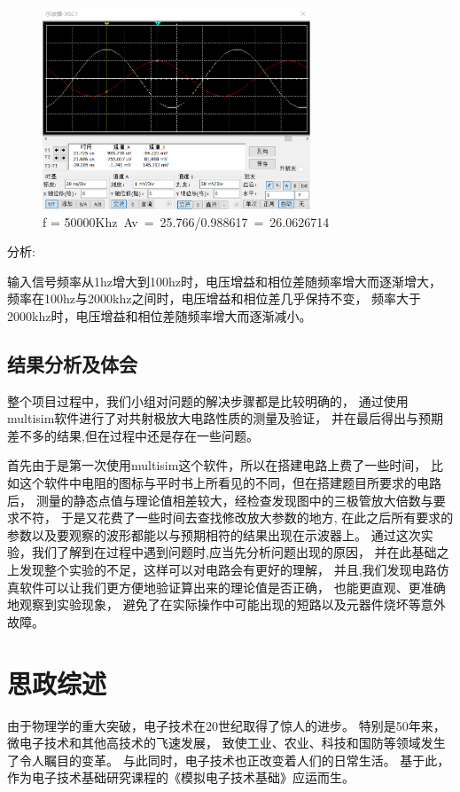 \documentclass[10pt, conference, compsocconf, a4paper]{IEEEtran}
\begin{document}
\begin{figure}[H]
  \includegraphics[width=8cm]{img/j.png}
  \caption{f = 50000Khz Av = 25.766/0.988617 = 26.0626714}
\end{figure}



分析:\par
输入信号频率从1hz增大到100hz时，电压增益和相位差随频率增大而逐渐增大，
频率在100hz与2000khz之间时，电压增益和相位差几乎保持不变，
频率大于2000khz时，电压增益和相位差随频率增大而逐渐减小。

\subsection{结果分析及体会}
整个项目过程中，我们小组对问题的解决步骤都是比较明确的，
通过使用multisim软件进行了对共射极放大电路性质的测量及验证，
并在最后得出与预期差不多的结果,但在过程中还是存在一些问题。\par
首先由于是第一次使用multisim这个软件，所以在搭建电路上费了一些时间，
比如这个软件中电阻的图标与平时书上所看见的不同，但在搭建题目所要求的电路后，
测量的静态点值与理论值相差较大，经检查发现图中的三极管放大倍数与要求不符，
于是又花费了一些时间去查找修改放大参数的地方,
在此之后所有要求的参数以及要观察的波形都能以与预期相符的结果出现在示波器上。
通过这次实验，我们了解到在过程中遇到问题时,应当先分析问题出现的原因，
并在此基础之上发现整个实验的不足，这样可以对电路会有更好的理解，
并且,我们发现电路仿真软件可以让我们更方便地验证算出来的理论值是否正确，
也能更直观、更准确地观察到实验现象，
避免了在实际操作中可能出现的短路以及元器件烧坏等意外故障。

\section{思政综述}

由于物理学的重大突破，电子技术在20世纪取得了惊人的进步。
特别是50年来，微电子技术和其他高技术的飞速发展，
致使工业、农业、科技和国防等领域发生了令人瞩目的变革。
与此同时，电子技术也正改变着人们的日常生活。
基于此，作为电子技术基础研究课程的《模拟电子技术基础》应运而生。\cite{wang2009}
\par
\end{document}
